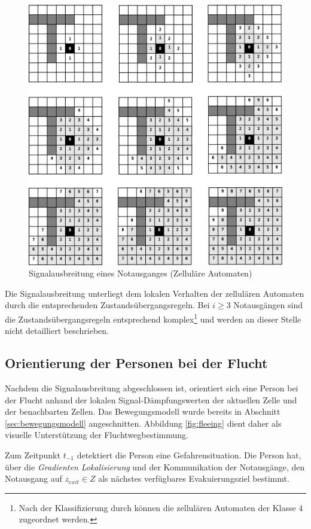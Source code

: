 \begin{figure}[!ht]
\centering
\includegraphics[height=0.9\textwidth]{algorithmik/flooding.eps}
\caption{Signalausbreitung eines Notausganges (Zelluläre Automaten)}
\label{fig:flooding}
\end{figure}

Die Signalausbreitung unterliegt dem lokalen Verhalten der zellulären Automaten durch die entsprechenden Zustandsübergangsregeln. Bei $i \geq 3$ Notausgängen sind die Zustandsübergangsregeln entsprechend komplex\footnote{Nach der Klassifizierung durch \cite{Wolfram} können die zellulären Automaten der Klasse 4 zugeordnet werden.} und werden an dieser Stelle nicht detailliert beschrieben.

\subsection{Orientierung der Personen bei der Flucht}

Nachdem die Signalausbreitung abgeschlossen ist, orientiert sich eine Person bei der Flucht anhand der lokalen Signal-Dämpfungswerten der aktuellen Zelle und der benachbarten Zellen. Das Bewegungsmodell wurde bereits in Abschnitt \ref{sec:bewegungsmodell} angeschnitten. Abbildung \ref{fig:fleeing} dient daher als visuelle Unterstützung der Fluchtwegbestimmung.

Zum Zeitpunkt $t_{-1}$ detektiert die Person eine Gefahrensituation. Die Person hat, über die \emph{Gradienten Lokalisierung} und der Kommunikation der Notausgänge, den Notausgang auf  $z_{exit} \in Z$ als nächstes verfügbares Evakuierungsziel bestimmt.

